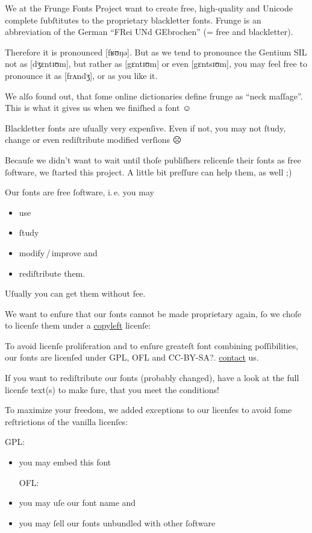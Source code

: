 \documentclass[
   titlepage=no]{scrartcl} %
\newcommand*\smiley{{\larger[3]☺}}
\newcommand*\frowney{{\larger[3]☹}}
\newcommand*\winkey{;)}
\newcommand*\ipa[1]{\mbox{#1}} %
\begin{document}
 We at the Frunge Fonts Project want to create free, high-quality and 
Unicode complete ſubſtitutes to the proprietary blackletter fonts. 
Frunge is an abbreviation of the German “FRei UNd GEbrochen” (= free and 
blackletter).

Therefore it is pronounced \ipa{[fʁʊŋə]}. But as we tend to pronounce 
the Gentium SIL not as \ipa{[dʒɛntɪʊm]}, but rather as \ipa{[gɛntɪʊm]} 
or even \ipa{[gɛntsɪʊm]}, you may feel free to pronounce it as 
\ipa{[frʌndʒ]}, or as you like it.

We alſo found out, that ſome online dictionaries define frunge as “neck 
maſſage”. This is what it gives us when we finiſhed a font \smiley


 Blackletter fonts are uſually very expenſive. Even if not, you may not 
ſtudy, change or even rediſtribute modified verſions \frowney

Becauſe we didn’t want to wait until thoſe publiſhers relicenſe their 
fonts as free ſoftware, we ſtarted this project. A little bit preſſure 
can help them, as well \winkey

Our fonts are free ſoftware, i.\,e. you may
 \begin{itemize}
  \item use
  \item ſtudy
  \item modify\,/\,improve and
  \item rediſtribute them.
 \end{itemize}

Uſually you can get them without fee.

We want to enſure that our fonts cannot be made proprietary again, ſo we 
choſe to licenſe them under a 
\href{http://en.wikipedia.org/wiki/Copyleft}{copyleft} licenſe:

To avoid licenſe proliferation and to enſure greateſt font combining 
poſſibilities, our fonts are licenſed under GPL, OFL and CC-BY-SA?.
\hyperlink{contact}{contact} us.

If you want to rediſtribute our fonts (probably changed), have a look at 
the full licenſe text(s) to make ſure, that you meet the conditions!

To maximize your freedom, we added exceptions to our licenſes to avoid 
ſome reſtrictions of the vanilla licenſes:

 GPL:
 \begin{itemize}
  \item you may embed this font

 OFL:
  \item you may uſe our font name and
  \item you may ſell our fonts unbundled with other ſoftware
 \end{itemize}
\end{document}
